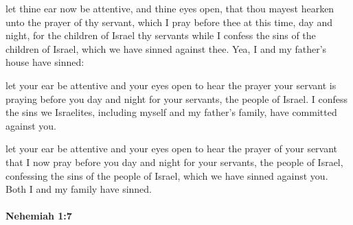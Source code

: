 			\begin{versebox}
					\item[BHS] 
					\item[LXX] 
					\item[ASV] let thine ear now be attentive, and thine eyes open, that thou mayest hearken unto the prayer of thy servant, which I pray before thee at this time, day and night, for the children of Israel thy servants while I confess the sins of the children of Israel, which we have sinned against thee. Yea, I and my father's house have sinned:
					\item[NIV] let your ear be attentive and your eyes open to hear the prayer your servant is praying before you day and night for your servants, the people of Israel. I confess the sins we Israelites, including myself and my father’s family, have committed against you.
					\item[NRSV] let your ear be attentive and your eyes open to hear the prayer of your servant that I now pray before you day and night for your servants, the people of Israel, confessing the sins of the people of Israel, which we have sinned against you. Both I and my family have sinned.
			\end{versebox}

		\paragraph{Nehemiah 1:7} %
			\label{NEHEMIAH-1-7}

